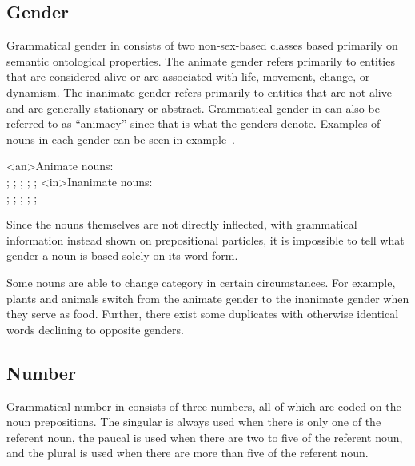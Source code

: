 \subsection{Gender}
\label{subsec:tvk-nouns-gender}

Grammatical gender in \langtvk{} consists of two\autocite{wals-30} non-sex-based\autocite{wals-31} classes based primarily on semantic ontological properties\autocite{wals-32}. The animate gender refers primarily to entities that are considered alive or are associated with life, movement, change, or dynamism. The inanimate gender refers primarily to entities that are not alive and are generally stationary or abstract. Grammatical gender in \langtvk{} can also be referred to as \enquote{animacy} since that is what the genders denote. Examples of nouns in each gender can be seen in example~.

	\a<an>Animate nouns:\\
		  ;   ;   ;   ;   ;   
	\a<in>Inanimate nouns:\\
		  ;   ;   ;   ;   ;   
\xe

Since the nouns themselves are not directly inflected, with grammatical information instead shown on prepositional particles, it is impossible to tell what gender a noun is based solely on its word form.

Some nouns are able to change category in certain circumstances. For example, plants and animals switch from the animate gender to the inanimate gender when they serve as food. Further, there exist some duplicates with otherwise identical words declining to opposite genders.

\subsection{Number}
\label{subsec:tvk-nouns-number}

Grammatical number in \langtvk{} consists of three numbers, all of which are coded on the noun prepositions\autocite{wals-33}. The singular is always used when there is only one of the referent noun, the paucal is used when there are two to five of the referent noun, and the plural is used when there are more than five of the referent noun.

